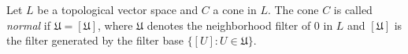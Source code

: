 Let $L$ be a topological vector space and $C$ a cone in $L$. The cone $C$ is called \emph{normal} if $\mathfrak{U} = [\mathfrak{U}]$, where $\mathfrak{U}$ denotes the neighborhood filter of $0$ in $L$ and $[\mathfrak{U}]$ is the filter generated by the filter base $\{[U] : U \in \mathfrak{U}\}$.
